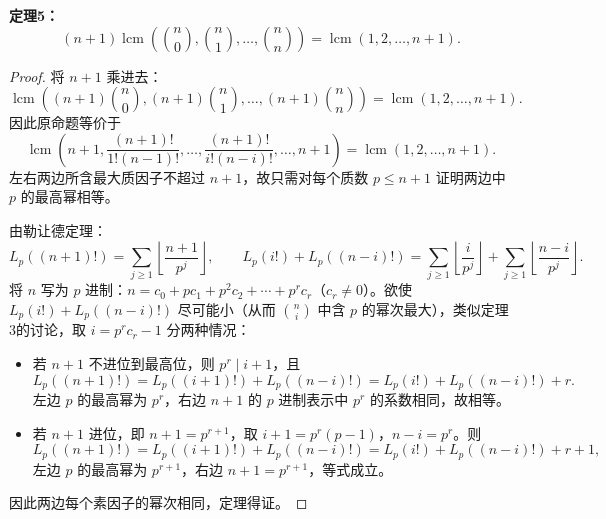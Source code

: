 \textbf{定理5：}
\[
(n+1)\operatorname{lcm}\left(\binom{n}{0}, \binom{n}{1}, \ldots, \binom{n}{n}\right) = \operatorname{lcm}(1,2,\ldots,n+1).
\]

\begin{proof}\leavevmode

将 $n+1$ 乘进去：
\[
\operatorname{lcm}\left((n+1)\binom{n}{0}, (n+1)\binom{n}{1}, \ldots, (n+1)\binom{n}{n}\right) = \operatorname{lcm}(1,2,\ldots,n+1).
\]
因此原命题等价于
\[
\operatorname{lcm}\left(n+1, \frac{(n+1)!}{1!(n-1)!}, \ldots, \frac{(n+1)!}{i!(n-i)!}, \ldots, n+1\right) = \operatorname{lcm}(1,2,\ldots,n+1).
\]
左右两边所含最大质因子不超过 $n+1$，故只需对每个质数 $p \le n+1$ 证明两边中 $p$ 的最高幂相等。

由勒让德定理：
\[
L_p((n+1)!) = \sum_{j\ge1}\left\lfloor\frac{n+1}{p^j}\right\rfloor,\qquad
L_p(i!)+L_p((n-i)!) = \sum_{j\ge1}\left\lfloor\frac{i}{p^j}\right\rfloor + \sum_{j\ge1}\left\lfloor\frac{n-i}{p^j}\right\rfloor.
\]
将 $n$ 写为 $p$ 进制：$n = c_0 + pc_1 + p^2c_2 + \cdots + p^r c_r$（$c_r \neq 0$）。欲使 $L_p(i!)+L_p((n-i)!)$ 尽可能小（从而 $\binom{n}{i}$ 中含 $p$ 的幂次最大），类似定理3的讨论，取 $i = p^r c_r - 1$ 分两种情况：
\begin{itemize}
\item 若 $n+1$ 不进位到最高位，则 $p^r \mid i+1$，且
\[
L_p((n+1)!) = L_p((i+1)!)+L_p((n-i)!)=L_p(i!)+L_p((n-i)!)+r.
\]
左边 $p$ 的最高幂为 $p^r$，右边 $n+1$ 的 $p$ 进制表示中 $p^r$ 的系数相同，故相等。
\item 若 $n+1$ 进位，即 $n+1 = p^{r+1}$，取 $i+1 = p^r(p-1)$，$n-i = p^r$。则
\[
L_p((n+1)!) = L_p((i+1)!)+L_p((n-i)!)=L_p(i!)+L_p((n-i)!)+r+1,
\]
左边 $p$ 的最高幂为 $p^{r+1}$，右边 $n+1 = p^{r+1}$，等式成立。
\end{itemize}
因此两边每个素因子的幂次相同，定理得证。

\end{proof}